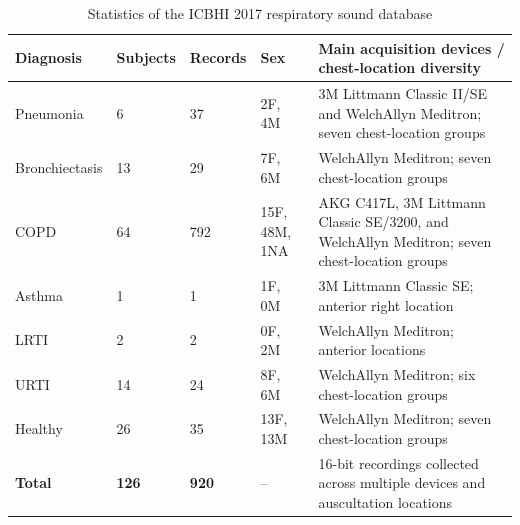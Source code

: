 \begin{table}[!t]
\centering
\caption{Statistics of the ICBHI 2017 respiratory sound database}
\label{tab:icbhi_demographics}
\footnotesize
\setlength{\tabcolsep}{3pt}
\renewcommand{\arraystretch}{1.12}
\begin{tabularx}{\textwidth}{@{}p{2.2cm}p{1.4cm}p{1.5cm}p{2.0cm}X@{}}
\toprule
\textbf{Diagnosis} & \textbf{Subjects} & \textbf{Records} & \textbf{Sex} & \textbf{Main acquisition devices / chest-location diversity} \\
\midrule
Pneumonia & 6 & 37 & 2F, 4M & 3M Littmann Classic II/SE and WelchAllyn Meditron; seven chest-location groups \\
Bronchiectasis & 13 & 29 & 7F, 6M & WelchAllyn Meditron; seven chest-location groups \\
COPD & 64 & 792 & 15F, 48M, 1NA & AKG C417L, 3M Littmann Classic SE/3200, and WelchAllyn Meditron; seven chest-location groups \\
Asthma & 1 & 1 & 1F, 0M & 3M Littmann Classic SE; anterior right location \\
LRTI & 2 & 2 & 0F, 2M & WelchAllyn Meditron; anterior locations \\
URTI & 14 & 24 & 8F, 6M & WelchAllyn Meditron; six chest-location groups \\
Healthy & 26 & 35 & 13F, 13M & WelchAllyn Meditron; seven chest-location groups \\
\midrule
\textbf{Total} & \textbf{126} & \textbf{920} & -- & 16-bit recordings collected across multiple devices and auscultation locations \\
\bottomrule
\end{tabularx}
\end{table}
